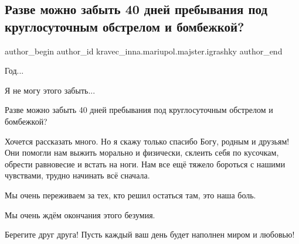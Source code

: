 
 
 
 
 

\subsection{Разве можно забыть 40 дней пребывания под круглосуточным обстрелом и бомбежкой?}
\label{sec:24_02_2023.fb.kravec_inna.mariupol.majster.igrashky.1.razve_mozhno_zabit_4}

\ifcmt
 author_begin
   author_id kravec_inna.mariupol.majster.igrashky
 author_end
\fi

Год...

Я не могу этого забыть... 

Разве можно забыть 40 дней пребывания под круглосуточным обстрелом и бомбежкой? 

Хочется рассказать много. Но я скажу только спасибо Богу, родным и друзьям! Они
помогли нам выжить морально и физически, склеить себя по кусочкам, обрести
равновесие и встать на ноги. Нам все ещё тяжело бороться с нашими чувствами,
трудно начинать всё сначала. 

Мы очень переживаем за тех, кто решил остаться там, это наша боль.

Мы очень ждём окончания этого безумия. 

Берегите друг друга! Пусть каждый ваш день будет наполнен миром и любовью!

